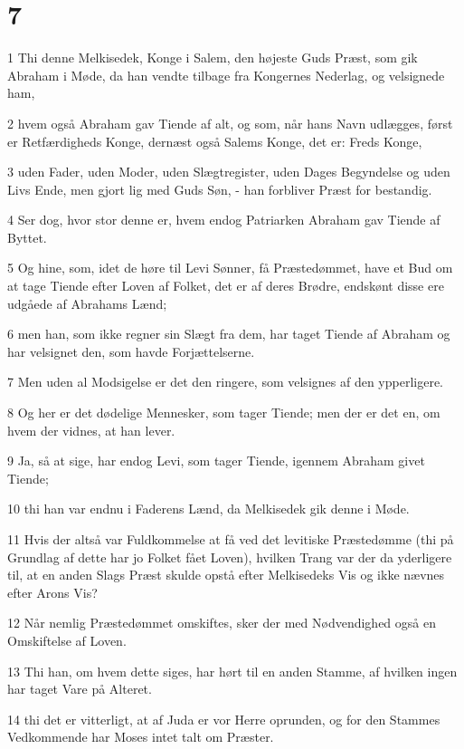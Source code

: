 \chapter{7}

\par 1 Thi denne Melkisedek, Konge i Salem, den højeste Guds Præst, som gik Abraham i Møde, da han vendte tilbage fra Kongernes Nederlag, og velsignede ham,
\par 2 hvem også Abraham gav Tiende af alt, og som, når hans Navn udlægges, først er Retfærdigheds Konge, dernæst også Salems Konge, det er: Freds Konge,
\par 3 uden Fader, uden Moder, uden Slægtregister, uden Dages Begyndelse og uden Livs Ende, men gjort lig med Guds Søn, - han forbliver Præst for bestandig.
\par 4 Ser dog, hvor stor denne er, hvem endog Patriarken Abraham gav Tiende af Byttet.
\par 5 Og hine, som, idet de høre til Levi Sønner, få Præstedømmet, have et Bud om at tage Tiende efter Loven af Folket, det er af deres Brødre, endskønt disse ere udgåede af Abrahams Lænd;
\par 6 men han, som ikke regner sin Slægt fra dem, har taget Tiende af Abraham og har velsignet den, som havde Forjættelserne.
\par 7 Men uden al Modsigelse er det den ringere, som velsignes af den ypperligere.
\par 8 Og her er det dødelige Mennesker, som tager Tiende; men der er det en, om hvem der vidnes, at han lever.
\par 9 Ja, så at sige, har endog Levi, som tager Tiende, igennem Abraham givet Tiende;
\par 10 thi han var endnu i Faderens Lænd, da Melkisedek gik denne i Møde.
\par 11 Hvis der altså var Fuldkommelse at få ved det levitiske Præstedømme (thi på Grundlag af dette har jo Folket fået Loven), hvilken Trang var der da yderligere til, at en anden Slags Præst skulde opstå efter Melkisedeks Vis og ikke nævnes efter Arons Vis?
\par 12 Når nemlig Præstedømmet omskiftes, sker der med Nødvendighed også en Omskiftelse af Loven.
\par 13 Thi han, om hvem dette siges, har hørt til en anden Stamme, af hvilken ingen har taget Vare på Alteret.
\par 14 thi det er vitterligt, at af Juda er vor Herre oprunden, og for den Stammes Vedkommende har Moses intet talt om Præster.
